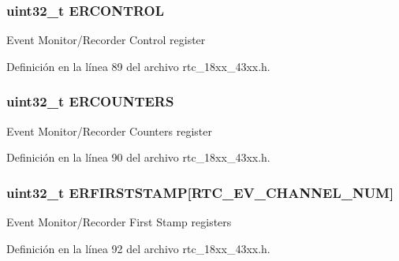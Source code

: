 \subsubsection[{\texorpdfstring{E\+R\+C\+O\+N\+T\+R\+OL}{ERCONTROL}}]{ uint32\+\_\+t E\+R\+C\+O\+N\+T\+R\+OL}\hypertarget{struct_l_p_c___r_t_c___t_a34bc46b28dbcccf7d64b7c71344bf8fd}{}\label{struct_l_p_c___r_t_c___t_a34bc46b28dbcccf7d64b7c71344bf8fd}
Event Monitor/\+Recorder Control register 

Definición en la línea 89 del archivo rtc\+\_\+18xx\+\_\+43xx.\+h.

\subsubsection[{\texorpdfstring{E\+R\+C\+O\+U\+N\+T\+E\+RS}{ERCOUNTERS}}]{ uint32\+\_\+t E\+R\+C\+O\+U\+N\+T\+E\+RS}\hypertarget{struct_l_p_c___r_t_c___t_aa5488dd2a91cca6ea4ac2dc1aa226076}{}\label{struct_l_p_c___r_t_c___t_aa5488dd2a91cca6ea4ac2dc1aa226076}
Event Monitor/\+Recorder Counters register 

Definición en la línea 90 del archivo rtc\+\_\+18xx\+\_\+43xx.\+h.

\subsubsection[{\texorpdfstring{E\+R\+F\+I\+R\+S\+T\+S\+T\+A\+MP}{ERFIRSTSTAMP}}]{ uint32\+\_\+t E\+R\+F\+I\+R\+S\+T\+S\+T\+A\+MP\mbox{[}{\bf R\+T\+C\+\_\+\+E\+V\+\_\+\+C\+H\+A\+N\+N\+E\+L\+\_\+\+N\+UM}\mbox{]}}\hypertarget{struct_l_p_c___r_t_c___t_aaedde7df38ce938df374f992e58baf7d}{}\label{struct_l_p_c___r_t_c___t_aaedde7df38ce938df374f992e58baf7d}
Event Monitor/\+Recorder First Stamp registers 

Definición en la línea 92 del archivo rtc\+\_\+18xx\+\_\+43xx.\+h.

